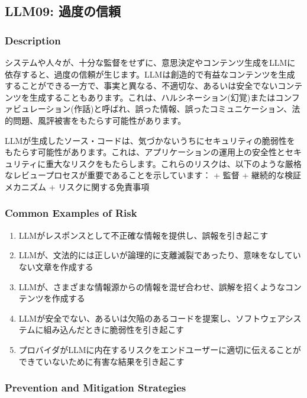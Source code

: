 \documentclass[
]{article}
\author{}
\date{}
\providecommand{\tightlist}{%
  \setlength{\itemsep}{0pt}\setlength{\parskip}{0pt}}
\begin{document}
\subsection{LLM09:
過度の信頼}\label{llm09-ux904eux5ea6ux306eux4fe1ux983c}

\subsubsection{Description}\label{description}

システムや人々が、十分な監督をせずに、意思決定やコンテンツ生成をLLMに依存すると、過度の信頼が生じます。LLMは創造的で有益なコンテンツを生成することができる一方で、事実と異なる、不適切な、あるいは安全でないコンテンツを生成することもあります。これは、ハルシネーション(幻覚)またはコンファビュレーション(作話)と呼ばれ、誤った情報、誤ったコミュニケーション、法的問題、風評被害をもたらす可能性があります。

LLMが生成したソース・コードは、気づかないうちにセキュリティの脆弱性をもたらす可能性があります。これは、アプリケーションの運用上の安全性とセキュリティに重大なリスクをもたらします。これらのリスクは、以下のような厳格なレビュープロセスが重要であることを示しています：
+ 監督 + 継続的な検証メカニズム + リスクに関する免責事項

\subsubsection{Common Examples of Risk}\label{common-examples-of-risk}

\begin{enumerate}
\def\labelenumi{\arabic{enumi}.}
\tightlist
\item
  LLMがレスポンスとして不正確な情報を提供し、誤報を引き起こす
\item
  LLMが、文法的には正しいが論理的に支離滅裂であったり、意味をなしていない文章を作成する
\item
  LLMが、さまざまな情報源からの情報を混ぜ合わせ、誤解を招くようなコンテンツを作成する
\item
  LLMが安全でない、あるいは欠陥のあるコードを提案し、ソフトウェアシステムに組み込んだときに脆弱性を引き起こす
\item
  プロバイダがLLMに内在するリスクをエンドユーザーに適切に伝えることができていないために有害な結果を引き起こす
\end{enumerate}

\subsubsection{Prevention and Mitigation
Strategies}\label{prevention-and-mitigation-strategies}
\end{document}
